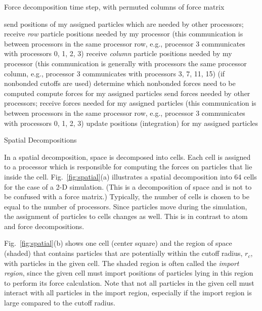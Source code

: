 \begin{algorithm}
\caption{Force decomposition time step, with permuted columns of force matrix}
\label{alg:force2}
\begin{algorithmic}[1]
\STATE send positions of my assigned particles which are needed by
other processors; receive {\em row} particle positions needed by my processor
(this communication is between processors in the same processor row, e.g., processor
3 communicates with processors 0, 1, 2, 3)
\STATE receive {\em column} particle positions needed by my processor
(this communication is generally with processors the same processor column, e.g.,
processor 3 communicates with processors 3, 7, 11, 15)
\STATE (if nonbonded cutoffs are used) determine which nonbonded forces need to be computed
\STATE compute forces for my assigned particles
\STATE send forces needed by other processors; receive forces needed for my
assigned particles (this communication is between processors in the same 
processor row, e.g., processor 3 communicates with processors 0, 1, 2, 3)
\STATE update positions (integration) for my assigned particles
\end{algorithmic}
\end{algorithm}

 {Spatial Decompositions}

In a spatial decomposition, space is decomposed into cells.
Each cell is assigned to a processor which is responsible
for computing the forces on particles that lie inside the cell.
Fig.~\ref{fig:spatial}(a) illustrates a spatial decomposition into 64 cells for the
case of a 2-D simulation.  (This is a decomposition of space and is
not to be confused with a force matrix.)  Typically, the number of cells
is chosen to be equal to the number of processors.
Since particles move during
the simulation, the assignment of particles to cells changes as well.
This is in contrast to atom and force decompositions.

Fig.~\ref{fig:spatial}(b) shows one cell (center square) and the region of space (shaded)
that contains particles that are potentially within the cutoff radius, $r_c$, with particles in 
the given cell.  The shaded region is often called the {\em import region}, since 
the given cell must import positions of particles lying in this region to 
perform its force calculation.  Note that 
not all particles in the given cell must interact with all particles in the import
region, especially if the import region is large compared to the cutoff radius.

